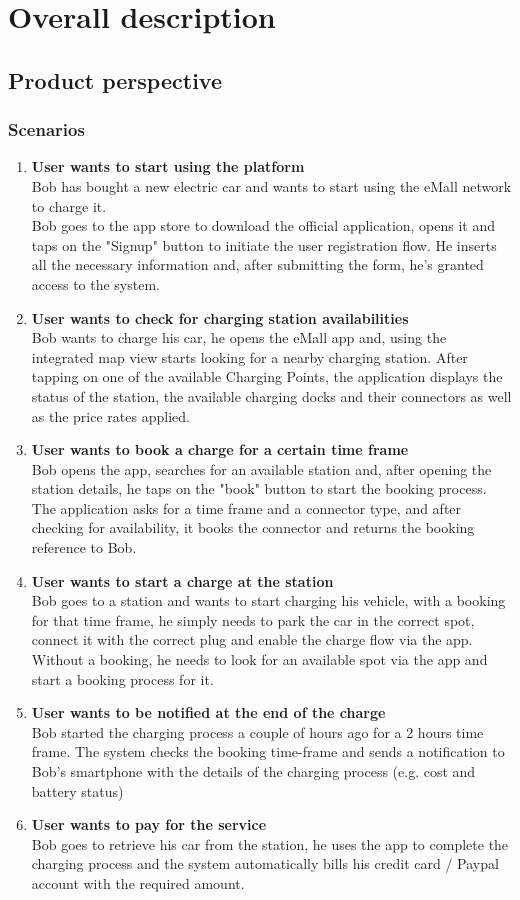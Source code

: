 \newcommand\descitem[1]{\item{\bfseries #1}\\}

\chapter{Overall description}
\section{Product perspective}
\subsection{Scenarios}

\begin{enumerate}
	\descitem{User wants to start using the platform}
	Bob has bought a new electric car and wants to start using the eMall network to charge it.\\ Bob goes to the app store to download the official application, opens it and taps on the "Signup" button to initiate the user registration flow. He inserts all the necessary information and, after submitting the form, he's granted access to the system. 
	
	\descitem{User wants to check for charging station availabilities}
	Bob wants to charge his car, he opens the eMall app and, using the integrated map view starts looking for a nearby charging station. After tapping on one of the available Charging Points, the application displays the status of the station, the available charging docks and their connectors as well as the price rates applied.
	
	\descitem{User wants to book a charge for a certain time frame}
	Bob opens the app, searches for an available station and, after opening the station details, he taps on the "book" button to start the booking process. The application asks for a time frame and a connector type, and after checking for availability, it books the connector and returns the booking reference to Bob.
	
	\descitem{User wants to start a charge at the station}
	Bob goes to a station and wants to start charging his vehicle, with a booking for that time frame, he simply needs to park the car in the correct spot, connect it with the correct plug and enable the charge flow via the app. Without a booking, he needs to look for an available spot via the app and start a booking process for it.
	
	\descitem{User wants to be notified at the end of the charge}
	Bob started the charging process a couple of hours ago for a 2 hours time frame. The system checks the booking time-frame and sends a notification to Bob's smartphone with the details of the charging process (e.g. cost and battery status)
	
	\descitem{User wants to pay for the service}
	Bob goes to retrieve his car from the station, he uses the app to complete the charging process and the system automatically bills his credit card / Paypal account with the required amount.
\end{enumerate}

